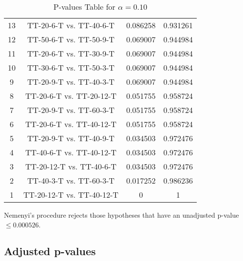 \documentclass[a4paper,10pt]{article}
\begin{document}
\begin{landscape}
\begin{table}[!htp]
\begin{tabular}{cccc}
13&TT-20-6-T vs. TT-40-6-T&0.086258&0.931261\\
12&TT-50-6-T vs. TT-50-9-T&0.069007&0.944984\\
11&TT-20-6-T vs. TT-30-9-T&0.069007&0.944984\\
10&TT-30-6-T vs. TT-50-3-T&0.069007&0.944984\\
9&TT-20-9-T vs. TT-40-3-T&0.069007&0.944984\\
8&TT-20-6-T vs. TT-20-12-T&0.051755&0.958724\\
7&TT-20-9-T vs. TT-60-3-T&0.051755&0.958724\\
6&TT-20-6-T vs. TT-40-12-T&0.051755&0.958724\\
5&TT-20-9-T vs. TT-40-9-T&0.034503&0.972476\\
4&TT-40-6-T vs. TT-40-12-T&0.034503&0.972476\\
3&TT-20-12-T vs. TT-40-6-T&0.034503&0.972476\\
2&TT-40-3-T vs. TT-60-3-T&0.017252&0.986236\\
1&TT-20-12-T vs. TT-40-12-T&0&1\\
\hline
\end{tabular}
\caption{P-values Table for $\alpha=0.10$}
\end{table}Nemenyi's procedure rejects those hypotheses that have an unadjusted p-value $\le0.000526$.

\pagebreak

\subsection{Adjusted p-values}


\end{landscape}
\end{document}
